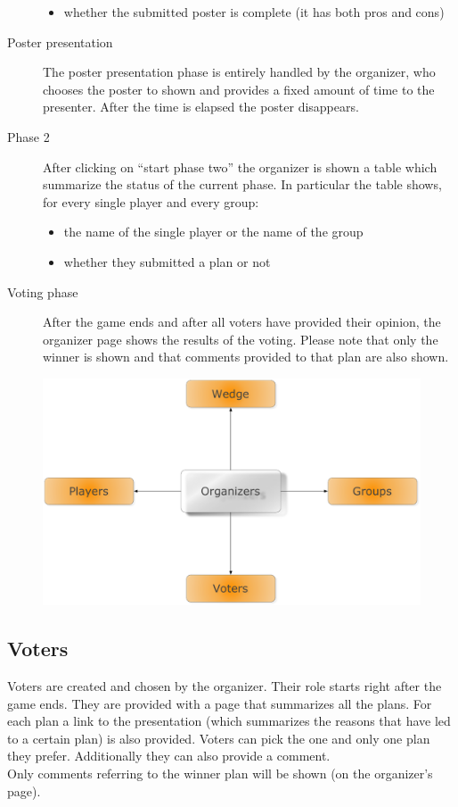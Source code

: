 \begin{description}
\begin{itemize}
		\item whether the submitted poster is complete (it has both pros and cons)
	\end{itemize}
	\item[Poster presentation] The poster presentation phase is entirely handled by the organizer, who chooses the poster to shown and provides a fixed amount of time to the presenter. After the time is elapsed the poster disappears.
	\item[Phase 2] After clicking on ``start phase two'' the organizer is shown a table which summarize the status of the current phase. In particular the table shows, for every single player and every group:
	\begin{itemize}
		\item the name of the single player or the name of the group
		\item whether they submitted a plan or not
	\end{itemize}
	\item[Voting phase] After the game ends and after all voters have provided their opinion, the organizer page shows the results of the voting. Please note that only the winner is shown and that comments provided to that plan are also shown.
\end{description}
    \begin{figure}[htbp]
    \begin{center}
      \includegraphics[width=12cm]{../img/Organizer.pdf}
    \end{center}
  \end{figure}

\subsection{Voters}
Voters are created and chosen by the organizer. Their role starts right after the game ends. They are provided with a page that summarizes all the plans. For each plan a link to the presentation (which summarizes the reasons that have led to a certain plan) is also provided. Voters can pick the one and only one plan they prefer. Additionally they can also provide a comment.\\
Only comments referring to the winner plan will be shown (on the organizer's page).

